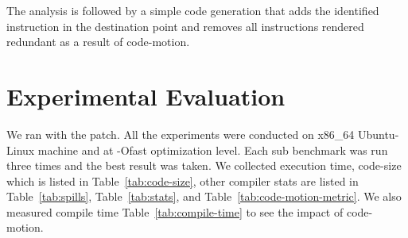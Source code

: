 \documentclass[acmlarge,review,anonymous]{acmart}\settopmatter{printfolios=true}
\begin{document}
The analysis is followed by a simple code generation that adds the identified
instruction in the destination point and removes all instructions rendered
redundant as a result of code-motion.


\section{Experimental Evaluation}
\label{sec:experimental-results}
We ran \SPEC{} with the patch. All the experiments were conducted on x86\_64
Ubuntu-Linux machine and at -Ofast optimization level. Each sub benchmark was
run three times and the best result was taken. We collected execution time,
code-size which is listed in Table~\ref{tab:code-size}, other compiler stats are
listed in Table~\ref{tab:spills}, Table~\ref{tab:stats}, and
Table~\ref{tab:code-motion-metric}.  We also measured compile time
Table~\ref{tab:compile-time} to see the impact of code-motion.
\end{document}
